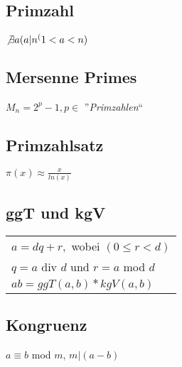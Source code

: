 \subsection{Primzahl}
$ \not \exists a (a|n ^ (1 < a < n) $

\subsection{Mersenne Primes}
$ M_n = 2^p - 1, p \in $ ''\textit{Primzahlen}``

\subsection{Primzahlsatz}
$ \pi (x) \approx \frac{x}{ln(x)} $

\subsection{ggT und kgV}
\begin{tabular}{l}
    $ a = dq + r, $ wobei $ (0 \leq r < d)$ \\
    $ q = a $ div $ d $ und $ r = a $ mod $ d $ \\
    $ ab = ggT(a, b) * kgV(a, b) $ \\
\end{tabular}

\subsection{Kongruenz}
$ a \equiv b $ mod $ m $, $ m|(a - b) $ 
